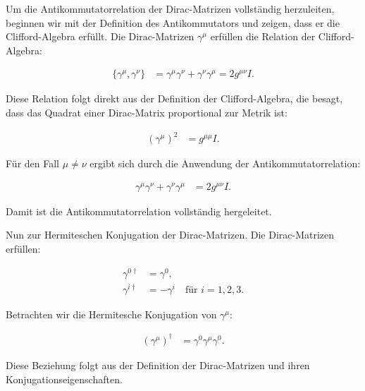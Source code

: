 Um die Antikommutatorrelation der Dirac-Matrizen vollständig herzuleiten, beginnen wir mit der Definition des Antikommutators und zeigen, dass er die Clifford-Algebra erfüllt. Die Dirac-Matrizen \(\gamma^\mu\) erfüllen die Relation der Clifford-Algebra:

\begin{align*}
\{\gamma^\mu, \gamma^\nu\} &= \gamma^\mu \gamma^\nu + \gamma^\nu \gamma^\mu = 2 g^{\mu \nu} I.
\end{align*}

Diese Relation folgt direkt aus der Definition der Clifford-Algebra, die besagt, dass das Quadrat einer Dirac-Matrix proportional zur Metrik ist:

\begin{align*}
(\gamma^\mu)^2 &= g^{\mu \mu} I.
\end{align*}

Für den Fall \(\mu \neq \nu\) ergibt sich durch die Anwendung der Antikommutatorrelation:

\begin{align*}
\gamma^\mu \gamma^\nu + \gamma^\nu \gamma^\mu &= 2 g^{\mu \nu} I.
\end{align*}

Damit ist die Antikommutatorrelation vollständig hergeleitet.

Nun zur Hermiteschen Konjugation der Dirac-Matrizen. Die Dirac-Matrizen erfüllen:

\begin{align*}
\gamma^{0 \dagger} &= \gamma^0, \\
\gamma^{i \dagger} &= -\gamma^i \quad \text{für } i = 1, 2, 3.
\end{align*}

Betrachten wir die Hermitesche Konjugation von \(\gamma^\mu\):

\begin{align*}
(\gamma^\mu)^\dagger &= \gamma^0 \gamma^\mu \gamma^0.
\end{align*}

Diese Beziehung folgt aus der Definition der Dirac-Matrizen und ihren Konjugationseigenschaften.

